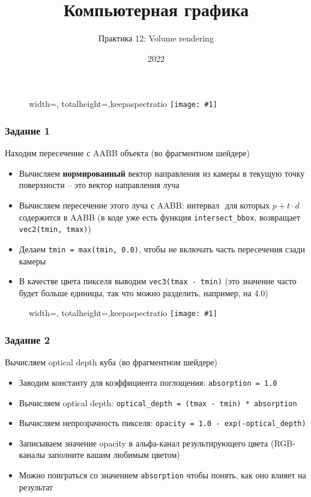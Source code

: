 \documentclass{beamer}
\title{Компьютерная графика}
\subtitle{Практика 12: Volume rendering}
\date{2022}
\newcommand{\slideimage}[1]{
  \begin{figure}
    \begin{adjustbox}{width=\textwidth, totalheight=\textheight-2\baselineskip-2\baselineskip,keepaspectratio}
      \texttt{[image: \#1]}
    \end{adjustbox}
  \end{figure}
}
\begin{document}
\frame{\titlepage}

\begin{frame}[fragile]
\slideimage{0.png}
\end{frame}

\begin{frame}[fragile]
\frametitle{Задание 1}
Находим пересечение с AABB объекта (во фрагментном шейдере)
\begin{itemize}
\item Вычисляем \textbf{нормированный} вектор направления из камеры в текущую точку поверхности -- это вектор направления луча
\item Вычисляем пересечение этого луча с AABB: интервал \begin{math}[t_{min}, t_{max}]\end{math} для которых \begin{math}p + t \cdot d\end{math} содержится в AABB (в коде уже есть функция \verb|intersect_bbox|, возвращает \verb|vec2(tmin, tmax)|)
\item Делаем \verb|tmin = max(tmin, 0.0)|, чтобы не включать часть пересечения сзади камеры
\item В качестве цвета пикселя выводим \verb|vec3(tmax - tmin)| (это значение часто будет больше единицы, так что можно разделить, например, на 4.0)
\end{itemize}
\end{frame}

\begin{frame}[fragile]
\slideimage{1.png}
\end{frame}

\begin{frame}[fragile]
\frametitle{Задание 2}
Вычисляем optical depth куба (во фрагментном шейдере)
\begin{itemize}
\item Заводим константу для коэффициента поглощения: \verb|absorption = 1.0|
\item Вычисляем optical depth: \verb|optical_depth = (tmax - tmin) * absorption|
\item Вычисляем непрозрачность пикселя: \verb|opacity = 1.0 - exp(-optical_depth)|
\item Записываем значение opacity в альфа-канал результирующего цвета (RGB-каналы заполните вашим любимым цветом)
\item Можно поиграться со значением \verb|absorption| чтобы понять, как оно влияет на результат
\end{itemize}
\end{frame}
\end{document}
